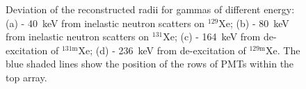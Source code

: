 \begin{figure}[!h]
\centering
{}
\caption[Deviation of the reconstructed radii for gammas of different energy]{Deviation of the reconstructed radii for gammas of different energy: (a) - 40~keV from inelastic neutron scatters on $^{129}$Xe; (b) - 80~keV from inelastic neutron scatters on $^{131}$Xe; (c) - 164~keV from de-excitation of $^{131\mathrm{m}}$Xe; (d) - 236~keV from de-excitation of $^{129\mathrm{m}}$Xe. The blue shaded lines show the position of the rows of PMTs within the top array.}
\label{figRdeviation}
\end{figure}


